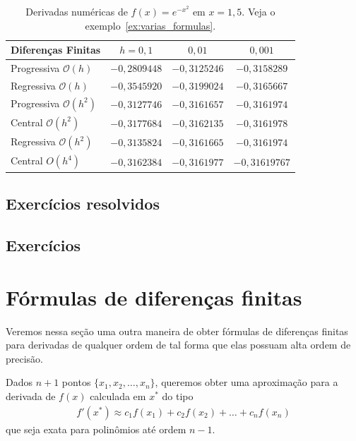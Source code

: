 \begin{sol}
\begin{table}
  \centering
  \begin{tabular}{l|ccc}
    Diferenças Finitas & $h=0,1$ & $0,01$ & $0,001$\\\hline
    Progressiva $\mathcal{O}(h)$ & $-0,2809448$ & $-0,3125246$ & $-0,3158289$\\
    Regressiva $\mathcal{O}(h)$ & $-0,3545920$ & $-0,3199024$ & $-0,3165667$\\
    Progressiva $\mathcal{O}(h^2)$ & $-0,3127746$ & $-0,3161657$ & $-0,3161974$\\
    Central $\mathcal{O}(h^2)$ & $-0,3177684$ & $-0,3162135$ & $-0,3161978$ \\
    Regressiva $\mathcal{O}(h^2)$ & $-0,3135824$ & $-0,3161665$ & $-0,3161974$\\
    Central $O(h^4)$ & $-0,3162384$ & $-0,3161977$ & $-0,31619767$ \\\hline
  \end{tabular}
  \caption{Derivadas numéricas de $f(x) = e^{-x^ 2}$ em $x=1,5$. Veja o exemplo~\ref{ex:varias_formulas}.}
  \label{tab:ex_varias_formulas}
\end{table}
\end{sol}

\subsection{Exercícios resolvidos}

\emconstrucao

\subsection*{Exercícios}

\emconstrucao


\section{Fórmulas de diferenças finitas}

Veremos nessa seção uma outra maneira de obter fórmulas de diferenças finitas para derivadas de qualquer ordem de tal forma que elas possuam alta ordem de precisão.

Dados $n+1$ pontos $\{x_1, x_2,\dotsc, x_n\}$, queremos obter uma aproximação para a derivada de $f(x)$ calculada em $x^*$ do tipo
\begin{eqnarray}\label{eq:regradif}
  f'(x^*)\approx c_1f(x_1)+c_2f(x_2)+\ldots +c_nf(x_n)
\end{eqnarray}
que seja exata para polinômios até ordem $n-1$.

